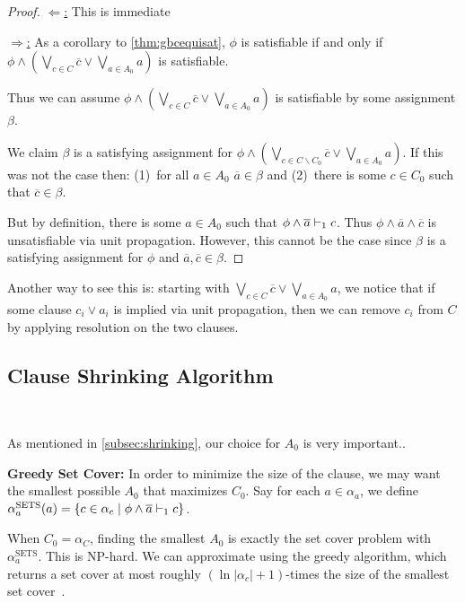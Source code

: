 \begin{proof}
    \underline{$\Leftarrow$:} This is immediate


    \underline{$\Rightarrow$:}  As a corollary to \autoref{thm:gbcequisat},
    $\phi$ is satisfiable if and only if $\phi \land (\bigvee_{c \in C}
    \overline{c} \lor \bigvee_{a \in A_0} a)$ is satisfiable.

    Thus we can assume $\phi \land (\bigvee_{c \in C} \overline{c} \lor
    \bigvee_{a \in A_0} a)$ is satisfiable by some assignment
    $\beta$.

    We claim $\beta$ is a satisfying assignment for $\phi \land (\bigvee_{c \in
    C \backslash C_0} \overline{c} \lor \bigvee_{a \in A_0} a)$. If this was not
    the case then: (1)~for all $a \in A_0$ $\overline{a} \in \beta$ and (2)~there
    is some $c \in C_0$ such that $\overline{c} \in \beta$. 

    But by definition, there is some $a \in A_0$ such that
    $\phi \land \overline{a} \vdash_1 c$. Thus $\phi \land \overline{a} \land
    \overline{c}$ is unsatisfiable via unit propagation. However, this cannot be
    the case since $\beta$ is a satisfying assignment for $\phi$ and
    $\overline{a}, \overline{c} \in \beta$.
\end{proof}

Another way to see this is: starting with $\bigvee_{c \in C} \overline{c} \lor
\bigvee_{a \in A_0} a$, we notice that if some clause $c_i \lor a_i$ is implied
via unit propagation, then we can remove $c_i$ from $C$ by applying resolution
on the two clauses.

\subsection{Clause Shrinking Algorithm}~\label{subsec:sym}

As mentioned in \autoref{subsec:shrinking}, our choice for $A_0$ is very important.. 


\noindent \textbf{Greedy Set Cover:} %
In order to minimize the size of the clause, we may want the smallest possible $A_0$ that maximizes $C_0$. Say for each $a \in \alpha_a$, we define $\alpha_a^\mathrm{SETS}(a) = \{ c \in \alpha_c \; | \; \phi \land \overline{a} \vdash_1 c\}$. 

When $C_0 = \alpha_C$, finding the smallest $A_0$ is exactly the set cover problem with $\alpha_a^\mathrm{SETS}$. This is NP-hard. We can approximate using the greedy algorithm, which returns a set cover at most roughly $(\ln |\alpha_c| + 1)$-times the size of the smallest set cover~\cite{greedysetcover}. 



